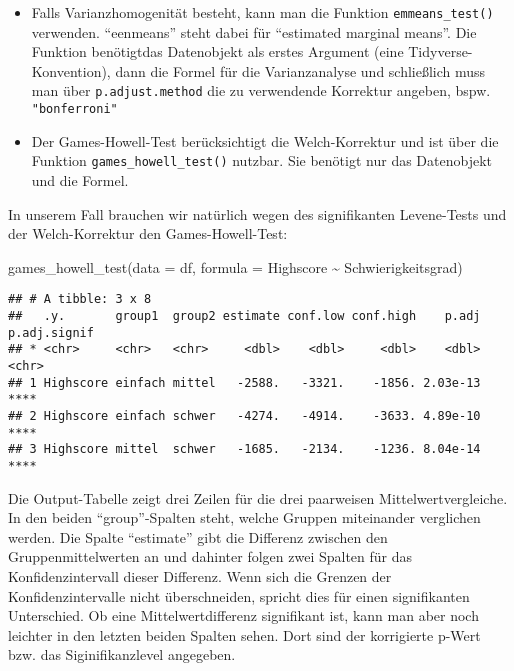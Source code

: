 \documentclass[
]{book}
\newenvironment{Shaded}{\begin{snugshade}}{\end{snugshade}}
\newcommand{\AttributeTok}[1]{\textcolor[rgb]{0.77,0.63,0.00}{#1}}
\newcommand{\FunctionTok}[1]{\textcolor[rgb]{0.00,0.00,0.00}{#1}}
\newcommand{\NormalTok}[1]{#1}
\newcommand{\SpecialCharTok}[1]{\textcolor[rgb]{0.00,0.00,0.00}{#1}}
\providecommand{\tightlist}{%
  \setlength{\itemsep}{0pt}\setlength{\parskip}{0pt}}
\begin{document}
\begin{itemize}
\tightlist
\item
  Falls Varianzhomogenität besteht, kann man die Funktion \texttt{emmeans\_test()} verwenden. ``eenmeans'' steht dabei für ``estimated marginal means''. Die Funktion benötigtdas Datenobjekt als erstes Argument (eine Tidyverse-Konvention), dann die Formel für die Varianzanalyse und schließlich muss man über \texttt{p.adjust.method} die zu verwendende Korrektur angeben, bspw. \texttt{"bonferroni"}
\item
  Der Games-Howell-Test berücksichtigt die Welch-Korrektur und ist über die Funktion \texttt{games\_howell\_test()} nutzbar. Sie benötigt nur das Datenobjekt und die Formel.
\end{itemize}

In unserem Fall brauchen wir natürlich wegen des signifikanten Levene-Tests und der Welch-Korrektur den Games-Howell-Test:

\begin{Shaded}
\begin{Highlighting}[]
\FunctionTok{games\_howell\_test}\NormalTok{(}\AttributeTok{data =}\NormalTok{ df,}
                  \AttributeTok{formula =}\NormalTok{ Highscore }\SpecialCharTok{\textasciitilde{}}\NormalTok{ Schwierigkeitsgrad)}
\end{Highlighting}
\end{Shaded}

\begin{verbatim}
## # A tibble: 3 x 8
##   .y.       group1  group2 estimate conf.low conf.high    p.adj p.adj.signif
## * <chr>     <chr>   <chr>     <dbl>    <dbl>     <dbl>    <dbl> <chr>       
## 1 Highscore einfach mittel   -2588.   -3321.    -1856. 2.03e-13 ****        
## 2 Highscore einfach schwer   -4274.   -4914.    -3633. 4.89e-10 ****        
## 3 Highscore mittel  schwer   -1685.   -2134.    -1236. 8.04e-14 ****
\end{verbatim}

Die Output-Tabelle zeigt drei Zeilen für die drei paarweisen Mittelwertvergleiche. In den beiden ``group''-Spalten steht, welche Gruppen miteinander verglichen werden. Die Spalte ``estimate'' gibt die Differenz zwischen den Gruppenmittelwerten an und dahinter folgen zwei Spalten für das Konfidenzintervall dieser Differenz. Wenn sich die Grenzen der Konfidenzintervalle nicht überschneiden, spricht dies für einen signifikanten Unterschied. Ob eine Mittelwertdifferenz signifikant ist, kann man aber noch leichter in den letzten beiden Spalten sehen. Dort sind der korrigierte p-Wert bzw. das Siginifikanzlevel angegeben.
\end{document}
